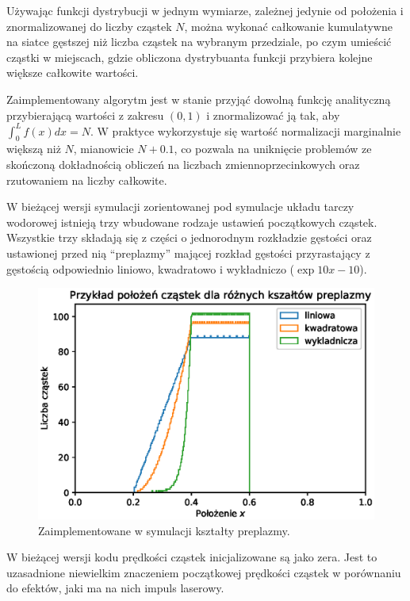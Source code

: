 Używając funkcji dystrybucji w jednym wymiarze, zależnej jedynie od
położenia i znormalizowanej do liczby cząstek $N$, można wykonać całkowanie
kumulatywne na siatce gęstszej niż liczba cząstek na wybranym przedziale,
po czym umieścić cząstki w miejscach, gdzie obliczona dystrybuanta funkcji
 przybiera kolejne większe całkowite wartości.

Zaimplementowany algorytm jest w stanie przyjąć dowolną funkcję analityczną
przybierającą  wartości z zakresu $(0, 1)$
i znormalizować ją tak, aby $\int_0^L
f(x) dx = N$. W praktyce wykorzystuje się wartość normalizacji marginalnie
większą niż $N$, mianowicie $N+0.1$, co pozwala na uniknięcie problemów ze
skończoną dokładnością obliczeń na liczbach zmiennoprzecinkowych oraz
rzutowaniem na liczby całkowite.

W bieżącej wersji symulacji zorientowanej pod symulacje układu tarczy
wodorowej istnieją trzy wbudowane rodzaje ustawień początkowych cząstek.
Wszystkie trzy składają się z części o jednorodnym rozkładzie gęstości oraz
ustawionej przed nią ``preplazmy'' mającej rozkład gęstości przyrastający z
gęstością odpowiednio liniowo, kwadratowo i wykładniczo ($\exp{10 x - 10}$).

\begin{figure}[h!]
  \includegraphics{Images/preplasma}
  \caption{Zaimplementowane w symulacji kształty preplazmy.\label{fig:preplasma-shapes}}
\end{figure}


W bieżącej wersji kodu prędkości cząstek inicjalizowane są jako zera. Jest to
uzasadnione niewielkim znaczeniem początkowej prędkości cząstek w
porównaniu do efektów, jaki ma na nich impuls laserowy.

